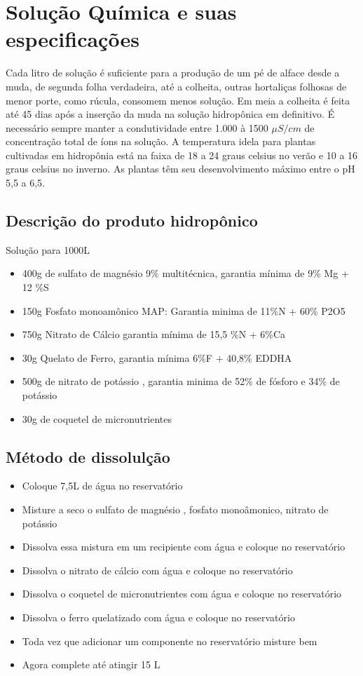 \section{Solução Química e suas especificações}

Cada litro de solução é suficiente para a produção de um pé de alface desde a muda, de segunda folha verdadeira, até a colheita, outras hortaliças folhosas de menor porte, como rúcula, consomem menos solução. Em meia a colheita é feita até 45 dias após a inserção da muda na solução hidropônica em definitivo. É necessário sempre manter a condutividade entre 1.000 à 1500 $\mu S/cm$ de concentração total de íons na solução. A temperatura idela para plantas cultivadas em hidropônia está na faixa de 18 a 24 graus celsius no verão e 10 a 16 graus celsius no inverno. As plantas têm seu desenvolvimento máximo entre o pH 5,5 a 6,5.

\subsection{Descrição do produto hidropônico}
Solução para 1000L
\begin{itemize}
	\item 400g de sulfato de magnésio 9\%  multitécnica, garantia mínima de 9\% Mg + 12 \%S
	\item 150g Fosfato monoamônico MAP: Garantia minima de 11\%N + 60\% P2O5
	\item 750g Nitrato de Cálcio garantia mínima de 15,5 \%N + 6\%Ca
	\item 30g Quelato de Ferro, garantia mínima 6\%F + 40,8\% EDDHA
	\item 500g de nitrato de potássio , garantia minima de 52\% de fósforo e 34\% de potássio
	\item 30g de coquetel de micronutrientes 
\end{itemize}

\subsection{Método de dissolulção}

\begin{itemize}
	\item Coloque 7,5L de água no reservatório
	\item Misture a seco o sulfato de magnésio , fosfato monoâmonico, nitrato de potássio
	\item Dissolva essa mistura em um recipiente com água e coloque no reservatório
	\item Dissolva o nitrato de cálcio com água e coloque no reservatório
	\item Dissolva o coquetel de micronutrientes  com água e coloque no reservatório
	\item  Dissolva o ferro quelatizado com água e coloque no reservatório
	\item Toda vez que adicionar um componente no reservatório misture bem
	\item Agora complete até atingir 15 L
\end{itemize}

